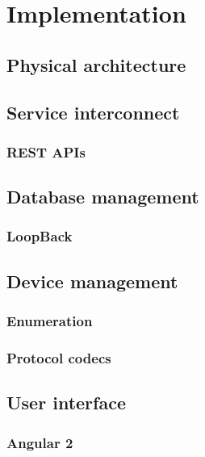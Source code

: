 \chapter{Implementation}



\section{Physical architecture}



\section{Service interconnect}

\subsection{REST APIs}



\section{Database management}

\subsection{LoopBack}


\section{Device management}

\subsection{Enumeration}
\subsection{Protocol codecs}



\section{User interface}

\subsection{Angular 2}